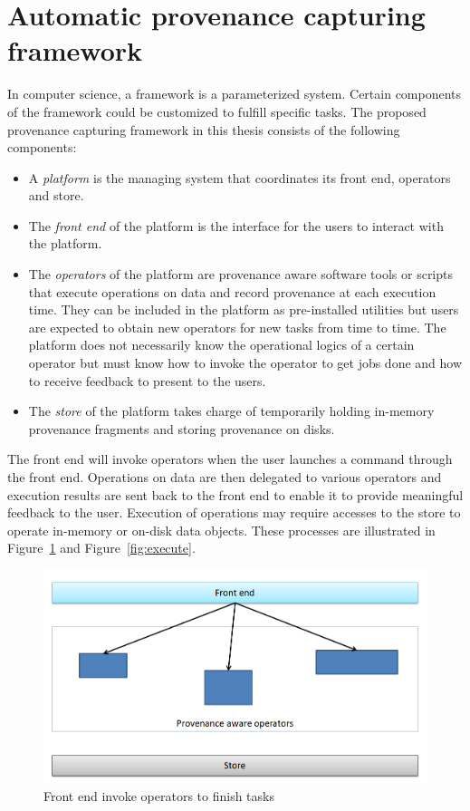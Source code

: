 \section{Automatic provenance capturing framework}
In computer science, a framework is a parameterized system. Certain components of the framework could be customized to fulfill specific tasks. The proposed provenance capturing framework in this thesis consists of the following components:
\begin{itemize}
	\item A \emph{platform} is the managing system that coordinates its front end, operators and store.
	\item The \emph{front end} of the platform is the interface for the users to interact with the platform.
	\item The \emph{operators} of the platform are provenance aware software tools or scripts that execute operations on data and record provenance at each execution time. They can be included in the platform as pre-installed utilities but users are expected to obtain new operators for new tasks from time to time. The platform does not necessarily know the operational logics of a certain operator but must know how to invoke the operator to get jobs done and how to receive feedback to present to the users.
	\item The \emph{store} of the platform takes charge of temporarily holding in-memory provenance fragments and storing provenance on disks.
\end{itemize}
The front end will invoke operators when the user launches a command through the front end. Operations on data are then delegated to various operators and execution results are sent back to the front end to enable it to provide meaningful feedback to the user. Execution of operations may require accesses to the store to operate in-memory or on-disk data objects. These processes are illustrated in Figure~\ref{fig:invoke} and Figure~\ref{fig:execute}.
\begin{figure}
	\centering
	\includegraphics[width=\textwidth]{invoke.png}
	\caption{Front end invoke operators to finish tasks}
	\label{fig:invoke}
\end{figure}
